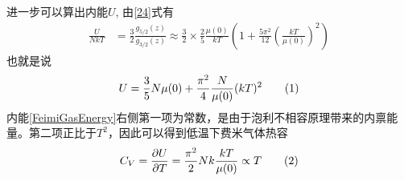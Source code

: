 \documentclass[draft]{article}
\begin{document}
	进一步可以算出内能$ U $, 由\eqref{24}式有
	\begin{align*}
	\frac{U}{NkT}&=\frac 32\frac{g_{5/2}(z)}{g_{3/2}(z)}\approx\frac 32\times\frac 25\frac{\mu(0)}{kT}\left(1+\frac{5\pi^2}{12}\left(\frac{kT}{\mu(0)}\right)^2\right)
	\end{align*}
	也就是说
	\[\label{FeimiGasEnergy}U=\frac 35N\mu(0)+\frac{\pi^2}{4}\frac{N}{\mu(0)}(kT)^2\taghere\]
	内能\eqref{FeimiGasEnergy}右侧第一项为常数，是由于泡利不相容原理带来的内禀能量。第二项正比于$ T^2 $，因此可以得到低温下费米气体热容
	\[C_V=\parDer UT=\frac{\pi^2}{2}Nk\frac{kT}{\mu(0)}\propto T\taghere\]
\end{document}

